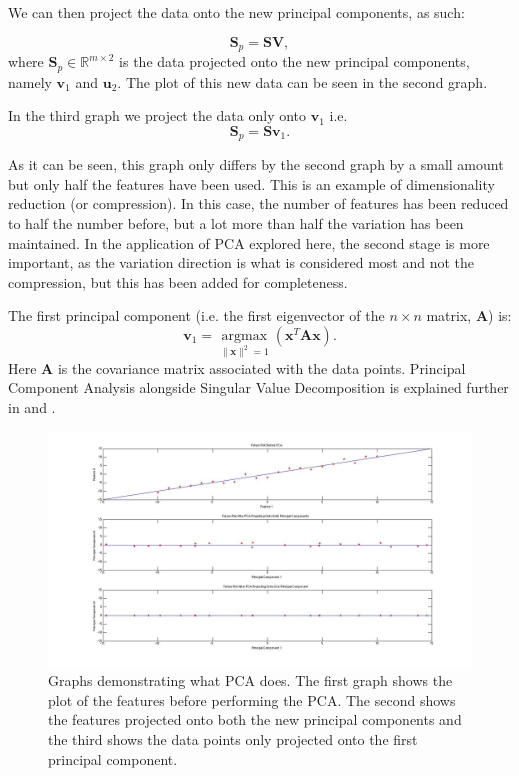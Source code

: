 \documentclass[11pt,a4paper]{article}
\newcommand{\covmat}{\mathbf{A}}
\begin{document}
We can then project the data onto the new principal components, as such:

\begin{equation*}
\mathbf{S}_p = \mathbf{S}\mathbf{V},
\end{equation*}
where $\mathbf{S}_p \in \mathbb{R}^{m \times 2}$ is the data projected onto the new principal components, namely $\mathbf{v}_1$ and $\mathbf{u}_2$. The plot of this new data can be seen in the second graph. 

In the third graph we project the data only onto $\mathbf{v}_1$ i.e.
\begin{equation*}
\mathbf{S}_p = \mathbf{S}\mathbf{v}_1.
\end{equation*}

As it can be seen, this graph only differs by the second graph by a small amount but only half the features have been used. This is an example of dimensionality reduction (or compression). In this case, the number of features has been reduced to half the number before, but a lot more than half the variation has been maintained. In the application of PCA explored here, the second stage is more important, as the variation direction is what is considered most and not the compression, but this has been added for completeness.

The first principal component (i.e. the first eigenvector of the $n\times n$ matrix, $\mathbf{A}$) is:
\begin{equation}
\mathbf{v}_1 = \underset{\|\mathbf{x}\|^2 = 1}{\operatorname{argmax}}\left( \mathbf{x}^T\mathbf{A}\mathbf{x}\right).
\end{equation}
Here $\covmat$ is the covariance matrix associated with the data points. Principal Component Analysis alongside Singular Value Decomposition is explained further in \cite{datascience} and \cite{bishop}. 

\begin{figure}[H]
\centering
\includegraphics[scale=0.35]{PCA_EXPLAINED.jpg}
\caption{Graphs demonstrating what PCA does. The first graph shows the plot of the features before performing the PCA. The second shows the features projected onto both the new principal components and the third shows the data points only projected onto the first principal component.}
\label{pca}
\end{figure}
\end{document}
